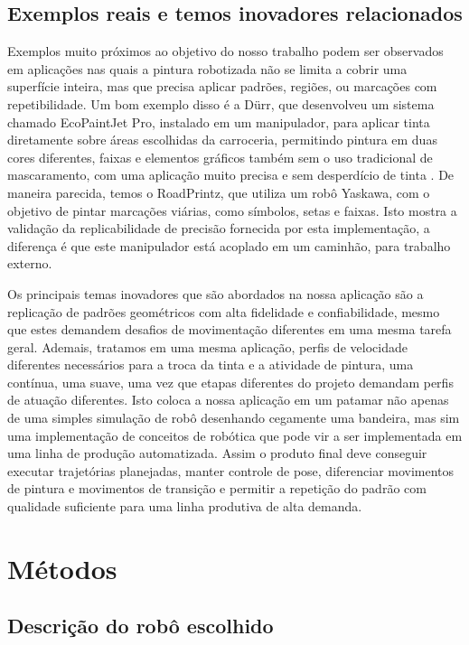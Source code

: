 \subsection{Exemplos reais e temos inovadores relacionados}

Exemplos muito próximos ao objetivo do nosso trabalho podem ser observados em aplicações nas quais a pintura robotizada não se limita a cobrir uma superfície inteira, mas que precisa aplicar padrões, regiões, ou marcações com repetibilidade. Um bom exemplo disso é a Dürr, que desenvolveu um sistema chamado EcoPaintJet Pro, instalado em um manipulador, para aplicar tinta diretamente sobre áreas escolhidas da carroceria, permitindo pintura em duas cores diferentes, faixas e elementos gráficos também sem o uso tradicional de mascaramento, com uma aplicação muito precisa e sem desperdício de tinta \cite{durr2026}. De maneira parecida, temos o RoadPrintz, que utiliza um robô Yaskawa, com o objetivo de pintar marcações viárias, como símbolos, setas e faixas. Isto mostra a validação da replicabilidade de precisão fornecida por esta implementação, a diferença é que este manipulador está acoplado em um caminhão, para trabalho externo.

Os principais temas inovadores que são abordados na nossa aplicação são a replicação de padrões geométricos com alta fidelidade e confiabilidade, mesmo que estes demandem desafios de movimentação diferentes em uma mesma tarefa geral. Ademais, tratamos em uma mesma aplicação, perfis de velocidade diferentes necessários para a troca da tinta e a atividade de pintura, uma contínua, uma suave, uma vez que etapas diferentes do projeto demandam perfis de atuação diferentes. Isto coloca a nossa aplicação em um patamar não apenas de uma simples simulação de robô desenhando cegamente uma bandeira, mas sim uma implementação de conceitos de robótica que pode vir a ser implementada em uma linha de produção automatizada. Assim o produto final deve conseguir executar trajetórias planejadas, manter controle de pose, diferenciar movimentos de pintura e movimentos de transição e permitir a repetição do padrão com qualidade suficiente para uma linha produtiva de alta demanda.


\section{Métodos}

\subsection{Descrição do robô escolhido}

